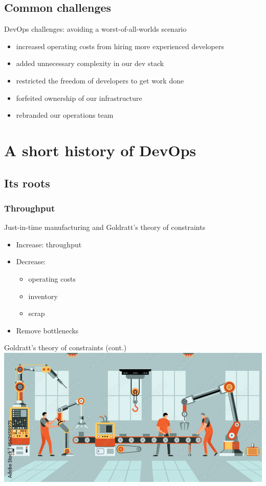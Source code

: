 \documentclass{beamer}
\begin{document}
	\subsection{Common challenges}
	\begin{frame}{DevOps challenges: avoiding a worst-of-all-worlds scenario}
		\begin{itemize}
			\item increased operating costs from hiring more experienced developers \pause
			\item added unnecessary complexity in our dev stack \pause
			\item restricted the freedom of developers to get work done \pause
			\item forfeited ownership of our infrastructure \pause 
			\item rebranded our operations team
		\end{itemize}
	\end{frame}
	\section{A short history of DevOps}
	\subsection{Its roots}
	\subsubsection{Throughput}
	\begin{frame}{Just-in-time manufacturing and Goldratt's theory of constraints}
		\begin{itemize}
			\item Increase: throughput \pause
			\item Decrease: \pause
			\begin{itemize}
				\item operating costs \pause
				\item inventory \pause
				\item scrap \pause
			\end{itemize}
			\item Remove bottlenecks
		\end{itemize}
	\end{frame}
	\begin{frame}{Goldratt's theory of constraints (cont.)}
		\includegraphics{assemblyline}
	\end{frame}
\end{document}
